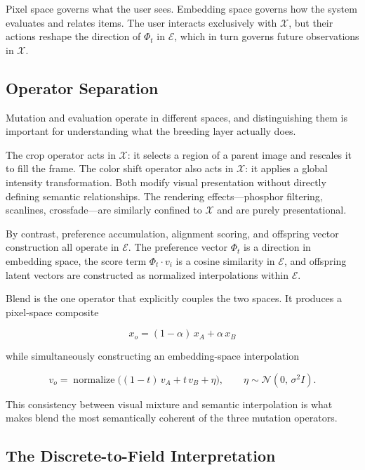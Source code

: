 \documentclass[12pt, a4paper]{article}
\theoremstyle{definition}
\begin{document}
Pixel space governs what the user sees. Embedding space governs how the system evaluates and relates items. The user interacts exclusively with $\mathcal{X}$, but their actions reshape the direction of $\Phi_t$ in $\mathcal{E}$, which in turn governs future observations in $\mathcal{X}$.

\subsection{Operator Separation}

Mutation and evaluation operate in different spaces, and distinguishing them is important for understanding what the breeding layer actually does.

The crop operator acts in $\mathcal{X}$: it selects a region of a parent image and rescales it to fill the frame. The color shift operator also acts in $\mathcal{X}$: it applies a global intensity transformation. Both modify visual presentation without directly defining semantic relationships. The rendering effects---phosphor filtering, scanlines, crossfade---are similarly confined to $\mathcal{X}$ and are purely presentational.

By contrast, preference accumulation, alignment scoring, and offspring vector construction all operate in $\mathcal{E}$. The preference vector $\Phi_t$ is a direction in embedding space, the score term $\Phi_t \cdot v_i$ is a cosine similarity in $\mathcal{E}$, and offspring latent vectors are constructed as normalized interpolations within $\mathcal{E}$.

Blend is the one operator that explicitly couples the two spaces. It produces a pixel-space composite

\begin{equation}
x_o = (1-\alpha)\, x_A + \alpha\, x_B
\end{equation}

while simultaneously constructing an embedding-space interpolation

\begin{equation}
v_o = \operatorname{normalize}\!\bigl((1-t)\,v_A + t\,v_B + \eta\bigr), \qquad \eta \sim \mathcal{N}(0,\,\sigma^2 I).
\end{equation}

This consistency between visual mixture and semantic interpolation is what makes blend the most semantically coherent of the three mutation operators.

\subsection{The Discrete-to-Field Interpretation}
\end{document}
